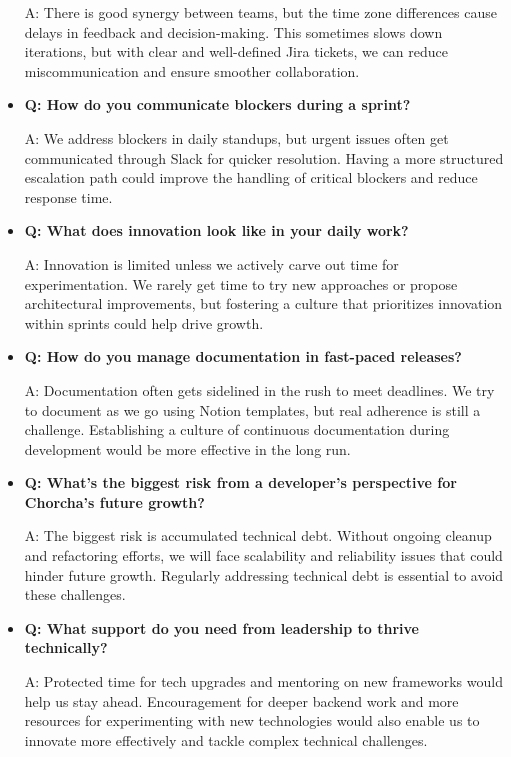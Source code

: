 \documentclass[12pt,a4paper,oneside]{book}
\begin{document}
\begin{itemize}
A: There is good synergy between teams, but the time zone differences cause delays in feedback and decision-making. This sometimes slows down iterations, but with clear and well-defined Jira tickets, we can reduce miscommunication and ensure smoother collaboration.

\item \textbf{Q: How do you communicate blockers during a sprint?} 

A: We address blockers in daily standups, but urgent issues often get communicated through Slack for quicker resolution. Having a more structured escalation path could improve the handling of critical blockers and reduce response time.

\item \textbf{Q: What does innovation look like in your daily work?} 

A: Innovation is limited unless we actively carve out time for experimentation. We rarely get time to try new approaches or propose architectural improvements, but fostering a culture that prioritizes innovation within sprints could help drive growth.

\item \textbf{Q: How do you manage documentation in fast-paced releases?} 

A: Documentation often gets sidelined in the rush to meet deadlines. We try to document as we go using Notion templates, but real adherence is still a challenge. Establishing a culture of continuous documentation during development would be more effective in the long run.

\item \textbf{Q: What’s the biggest risk from a developer’s perspective for Chorcha’s future growth?} 

A: The biggest risk is accumulated technical debt. Without ongoing cleanup and refactoring efforts, we will face scalability and reliability issues that could hinder future growth. Regularly addressing technical debt is essential to avoid these challenges.

\item \textbf{Q: What support do you need from leadership to thrive technically?} 

A: Protected time for tech upgrades and mentoring on new frameworks would help us stay ahead. Encouragement for deeper backend work and more resources for experimenting with new technologies would also enable us to innovate more effectively and tackle complex technical challenges.
\end{itemize}
\end{document}
